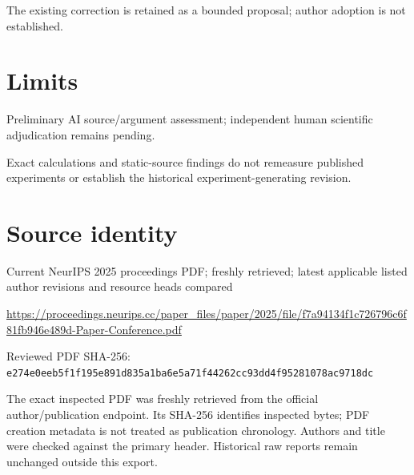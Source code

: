 \documentclass[11pt]{article}
\begin{document}
The existing correction is retained as a bounded proposal; author adoption is not established.

\section*{Limits}

Preliminary AI source/argument assessment; independent human scientific adjudication remains pending.\par

Exact calculations and static-source findings do not remeasure published experiments or establish the historical experiment-generating revision.\par

\section*{Source identity}

Current NeurIPS 2025 proceedings PDF; freshly retrieved; latest applicable listed author revisions and resource heads compared

\url{https://proceedings.neurips.cc/paper_files/paper/2025/file/f7a94134f1c726796c6f81fb946e489d-Paper-Conference.pdf}

Reviewed PDF SHA-256: \nolinkurl{e274e0eeb5f1f195e891d835a1ba6e5a71f44262cc93dd4f95281078ac9718dc}

The exact inspected PDF was freshly retrieved from the official author/publication endpoint. Its SHA-256 identifies inspected bytes; PDF creation metadata is not treated as publication chronology. Authors and title were checked against the primary header. Historical raw reports remain unchanged outside this export.
\end{document}
